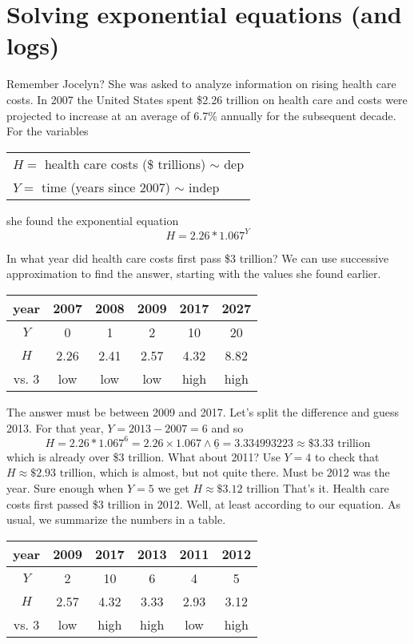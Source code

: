 

\section{Solving exponential equations (and logs)}

Remember Jocelyn?  She was asked to analyze information on rising health care costs.  In 2007 the United States spent \$2.26 trillion on health care and costs were projected to increase at an average of 6.7\% annually for the subsequent decade.  For the variables
\begin{center}
\begin{tabular} {l} 
$H=$ health care costs (\$ trillions) $\sim$ dep \\
$Y= $ time (years since 2007) $\sim$ indep \\ 
\end{tabular}
\end{center}she found the exponential equation $$H = 2.26\ast 1.067^{Y}$$

In what year did health care costs first pass \$3 trillion?  We can use successive approximation to find the answer, starting with the values she found earlier. 
\begin{center}
\begin{tabular} {|c| |c |c |c |c |c|}\hline
year & 2007 & 2008 & 2009 & 2017 & 2027 \\ \hline
$Y$ & 0 & 1 & 2 & 10 & 20 \\ \hline
$H$ & 2.26 & 2.41 & 2.57 & 4.32 & 8.82 \\ \hline
vs. 3 & low & low & low & high & high \\ \hline
\end{tabular}
\end{center}
The answer must be between 2009 and 2017.  Let's split the difference and guess 2013.  For that year, $Y = 2013-2007 = 6$ and so 
$$H = 2.26 \ast 1.067^6 = 2.26 \times 1.067 \wedge \underline{6} = 3.334993223 \approx \$3.33 \text{ trillion}$$ 
which is already over \$3 trillion.  What about 2011?  Use $Y=4$ to check that $H  \approx \$2.93 \text{ trillion}$, which is
almost, but not quite there.  Must be 2012 was the year.  Sure enough when $Y=5$ we get $H \approx \$3.12 \text{ trillion}$ That's it.  Health care costs first passed \$3 trillion in 2012.  Well, at least according to our equation.  As usual, we summarize the numbers in a table.
\begin{center}
\begin{tabular} {|c| |c |c |c |c |c|}\hline
year &  2009 & 2017 & 2013 & 2011 & 2012 \\ \hline
$Y$ & 2 & 10 & 6 & 4 & 5 \\ \hline
$H$ & 2.57 &4.32 & 3.33 & 2.93 &  3.12 \\ \hline
vs. 3 & low & high & high & low & high \\ \hline
\end{tabular}
\end{center}

